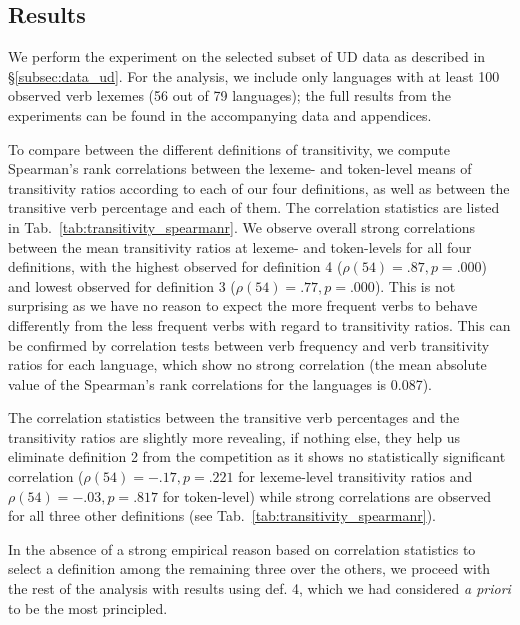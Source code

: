 \subsection{Results}



We perform the experiment on the selected subset of UD data as described in §\ref{subsec:data_ud}. For the analysis, we include only languages with at least 100 observed verb lexemes (56 out of 79 languages); the full results from the experiments can be found in the accompanying data and appendices. 

To compare between the different definitions of transitivity, we compute Spearman's rank correlations between the lexeme- and token-level means of transitivity ratios according to each of our four definitions, as well as between the transitive verb percentage and each of them. The correlation statistics are listed in Tab.~\ref{tab:transitivity_spearmanr}. We observe overall strong correlations between the mean transitivity ratios at lexeme- and token-levels for all four definitions, with the highest observed for definition 4 ($\rho(54)=.87, p=.000$) and lowest observed for definition 3 ($\rho(54)=.77, p=.000$). This is not surprising as we have no reason to expect the more frequent verbs to behave differently from the less frequent verbs with regard to transitivity ratios. This can be confirmed by correlation tests between verb frequency and verb transitivity ratios for each language, which show no strong correlation (the mean absolute value of the Spearman's rank correlations for the languages is 0.087).

The correlation statistics between the transitive verb percentages and the transitivity ratios are slightly more revealing, if nothing else, they help us eliminate definition 2 from the competition as it shows no statistically significant correlation ($\rho(54)=-.17, p=.221$ for lexeme-level transitivity ratios and $\rho(54)=-.03, p=.817$ for token-level) while strong correlations are observed for all three other definitions (see Tab.~\ref{tab:transitivity_spearmanr}).

In the absence of a strong empirical reason based on correlation statistics to select a definition among the remaining three over the others, we proceed with the rest of the analysis with results using def. 4, which we had considered \textit{a priori} to be the most principled.



